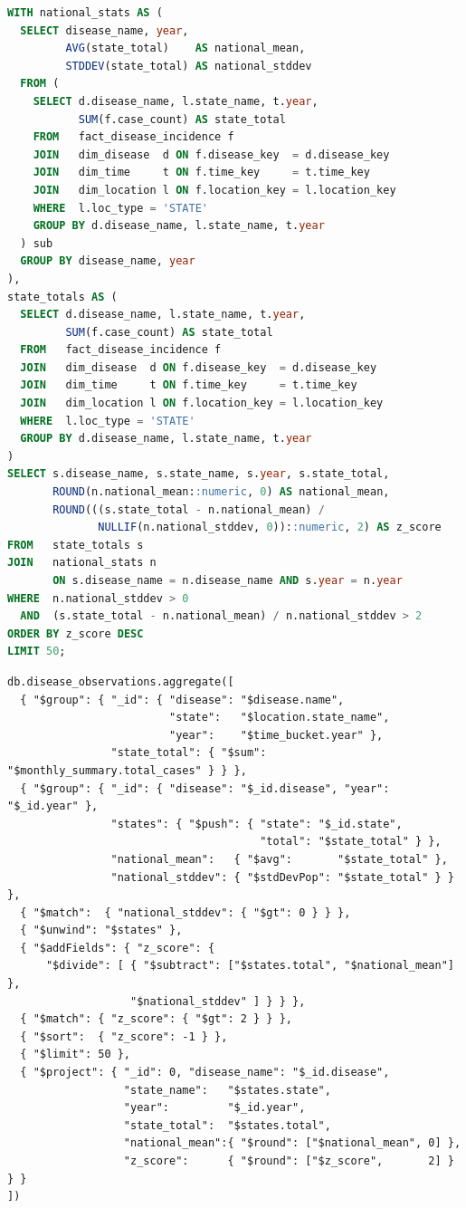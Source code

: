 \documentclass[12pt,a4paper]{article}
\begin{document}
\begin{lstlisting}[language=SQL, caption={Q9: PostgreSQL. A CTE pair computes per-state yearly totals and per-year national mean/stddev, then joins them to derive the z-score.}]
WITH national_stats AS (
  SELECT disease_name, year,
         AVG(state_total)    AS national_mean,
         STDDEV(state_total) AS national_stddev
  FROM (
    SELECT d.disease_name, l.state_name, t.year,
           SUM(f.case_count) AS state_total
    FROM   fact_disease_incidence f
    JOIN   dim_disease  d ON f.disease_key  = d.disease_key
    JOIN   dim_time     t ON f.time_key     = t.time_key
    JOIN   dim_location l ON f.location_key = l.location_key
    WHERE  l.loc_type = 'STATE'
    GROUP BY d.disease_name, l.state_name, t.year
  ) sub
  GROUP BY disease_name, year
),
state_totals AS (
  SELECT d.disease_name, l.state_name, t.year,
         SUM(f.case_count) AS state_total
  FROM   fact_disease_incidence f
  JOIN   dim_disease  d ON f.disease_key  = d.disease_key
  JOIN   dim_time     t ON f.time_key     = t.time_key
  JOIN   dim_location l ON f.location_key = l.location_key
  WHERE  l.loc_type = 'STATE'
  GROUP BY d.disease_name, l.state_name, t.year
)
SELECT s.disease_name, s.state_name, s.year, s.state_total,
       ROUND(n.national_mean::numeric, 0) AS national_mean,
       ROUND(((s.state_total - n.national_mean) /
              NULLIF(n.national_stddev, 0))::numeric, 2) AS z_score
FROM   state_totals s
JOIN   national_stats n
       ON s.disease_name = n.disease_name AND s.year = n.year
WHERE  n.national_stddev > 0
  AND  (s.state_total - n.national_mean) / n.national_stddev > 2
ORDER BY z_score DESC
LIMIT 50;
\end{lstlisting}

\begin{lstlisting}[language={}, caption={Q9: MongoDB. \texttt{\$stdDevPop} computes the per-year national standard deviation inline.}]
db.disease_observations.aggregate([
  { "$group": { "_id": { "disease": "$disease.name",
                         "state":   "$location.state_name",
                         "year":    "$time_bucket.year" },
                "state_total": { "$sum": "$monthly_summary.total_cases" } } },
  { "$group": { "_id": { "disease": "$_id.disease", "year": "$_id.year" },
                "states": { "$push": { "state": "$_id.state",
                                       "total": "$state_total" } },
                "national_mean":   { "$avg":       "$state_total" },
                "national_stddev": { "$stdDevPop": "$state_total" } } },
  { "$match":  { "national_stddev": { "$gt": 0 } } },
  { "$unwind": "$states" },
  { "$addFields": { "z_score": {
      "$divide": [ { "$subtract": ["$states.total", "$national_mean"] },
                   "$national_stddev" ] } } },
  { "$match": { "z_score": { "$gt": 2 } } },
  { "$sort":  { "z_score": -1 } },
  { "$limit": 50 },
  { "$project": { "_id": 0, "disease_name": "$_id.disease",
                  "state_name":   "$states.state",
                  "year":         "$_id.year",
                  "state_total":  "$states.total",
                  "national_mean":{ "$round": ["$national_mean", 0] },
                  "z_score":      { "$round": ["$z_score",       2] } } }
])
\end{lstlisting}
\end{document}
